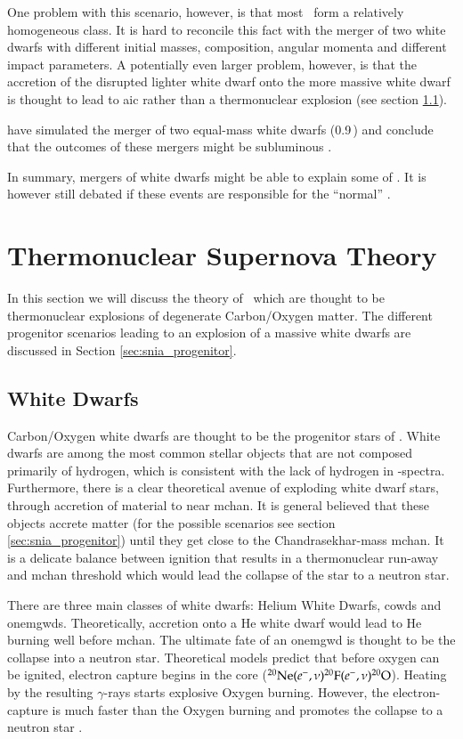 One problem with this scenario, however, is that most \snia\ form a relatively homogeneous class. It is hard to reconcile this fact with the merger of two white dwarfs with different initial masses, composition, angular momenta and different impact parameters. A potentially even larger problem, however, is that the accretion of the disrupted lighter white dwarf onto the more massive white dwarf is thought to lead to \gls{aic} rather than a thermonuclear explosion (see section \ref{sec:white_dwarfs}).

\cite{2010Natur.463...61P} have simulated the merger of two equal-mass white dwarfs (0.9\,\msun) and conclude that the outcomes of these mergers might be subluminous \sneia.

In summary, mergers of white dwarfs might be able to explain some of \snia. It is however still debated if these events are responsible for the ``normal'' \sneia. 

\section{Thermonuclear Supernova Theory}
In this section we will discuss the theory of \sneia\ which are thought to be thermonuclear explosions of degenerate Carbon/Oxygen matter. The different progenitor scenarios leading to an explosion of a massive white dwarfs are discussed in Section \ref{sec:snia_progenitor}.

\subsection{White Dwarfs}
\label{sec:white_dwarfs}
Carbon/Oxygen white dwarfs are thought to be the progenitor stars of \sneia. White dwarfs are among the most common stellar objects that are not composed primarily of hydrogen, which is consistent with the lack of hydrogen in \snia-spectra. Furthermore, there is a clear theoretical avenue of exploding white dwarf stars, through accretion of material to near \gls{mchan}. It is general believed that these objects accrete matter (for the possible scenarios see section \ref{sec:snia_progenitor}) until they get close to the Chandrasekhar-mass \gls{mchan}. It is a delicate balance between ignition that results in a thermonuclear run-away and \gls{mchan} threshold which would lead the collapse of the star to a neutron star.
 
There are three main classes of white dwarfs: Helium White Dwarfs, \glspl{cowd} and \glspl{onemgwd}. Theoretically, accretion onto a He white dwarf would lead to He burning well before \gls{mchan}. The ultimate fate of an \gls{onemgwd} is thought to be the collapse into a neutron star. Theoretical models predict that before oxygen can be ignited, electron capture begins in the core ($\Ne(e^-,\nu)\F[20](e^-,\nu)\Ox[20]$). Heating by the resulting $\gamma$-rays starts explosive Oxygen burning. However, the electron-capture is much faster than the Oxygen burning and promotes the collapse to a neutron star \citep{1991ApJ...367L..19N, 2005A&A...435..231G}. 


